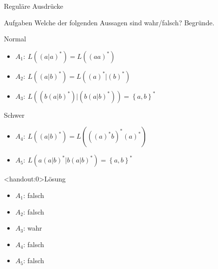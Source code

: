 {
\begin{frame}{Reguläre Ausdrücke}
    \begin{alertblock}{Aufgaben}
        Welche der folgenden Aussagen sind wahr/falsch? Begründe.
    \end{alertblock}
    \begin{block}{Normal}
        \begin{itemize}
            \item $A_1:\ L\left(\left(a|a\right)^*\right) = L\left(\left(aa\right)^*\right)$
            \item $A_2:\ L\left(\left(a|b\right)^*\right) = L\left(\left(a\right)^*|\left(b\right)^*\right)$
            \item $A_3:\
                      L\left(\left(b\left(a|b\right)^*\right)|\left(b\left(a|b\right)^*\right)\right) = \left\{a,b\right\}^*$
        \end{itemize}
    \end{block}
    \begin{block}{Schwer}
        \begin{itemize}
            \item $A_4:\
                      L\left(\left(a|b\right)^*\right) = L\left(\left(\left(a\right)^*b\right)^*\left(a\right)^*\right)$
            \item $A_5:\ L\left(a\left(a|b\right)^*|b\left(a|b\right)^*\right) = \left\{a,b\right\}^*$
        \end{itemize}
    \end{block}
\end{frame}
}

{
\begin{frame}<handout:0>{Lösung}
    \begin{itemize}[<+- | alert@+>]
        \item $A_1$: falsch
        \item $A_2$: falsch
        \item $A_3$: wahr
        \item $A_4$: falsch
        \item $A_5$: falsch
    \end{itemize}
\end{frame}
}

%
%

